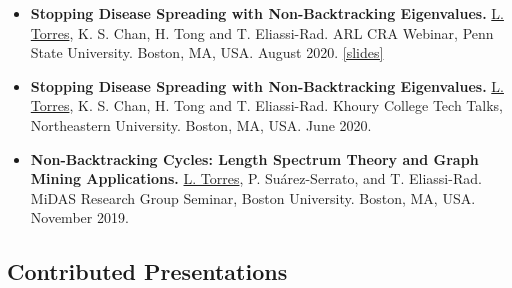 \documentclass[12pt,]{scrartcl}
\newenvironment{myitemize}
{ \begin{itemize}
    \setlength{\itemsep}{5pt}
    \setlength{\parskip}{0pt}
    \setlength{\parsep}{0pt}     }
{ \end{itemize}                  }
\begin{document}
\begin{myitemize}
\leftskip-0.25in %

\item \textbf{Stopping Disease Spreading with Non-Backtracking Eigenvalues.} \underline{L. Torres}, K. S. Chan, H. Tong and T. Eliassi-Rad. ARL CRA Webinar, Penn State University. Boston, MA, USA. August 2020. \href{http://leotrs.com/static/X_centrality_ARL_CRA_webinar.pdf}{[slides]}

\item \textbf{Stopping Disease Spreading with Non-Backtracking Eigenvalues.} \underline{L. Torres}, K. S. Chan, H. Tong and T. Eliassi-Rad. Khoury College Tech Talks, Northeastern University. Boston, MA, USA. June 2020.

\item \textbf{Non-Backtracking Cycles: Length Spectrum Theory and Graph Mining Applications.} \underline{L. Torres}, P. Su\'arez-Serrato, and T. Eliassi-Rad. MiDAS Research Group Seminar, Boston University. Boston, MA, USA. November 2019.

\end{myitemize}

\subsection{Contributed Presentations}\label{contributed-presentations}
\end{document}

